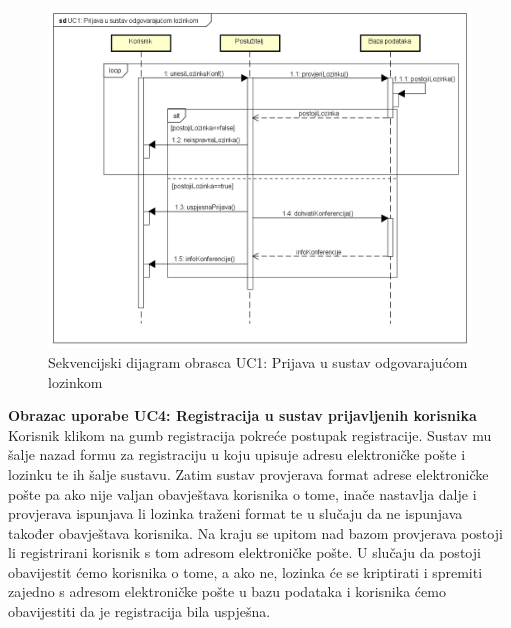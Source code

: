 				\begin{figure}[H]
					\includegraphics[width=\textwidth]{slike/uc1Sekvencijski.PNG} %
					\caption{Sekvencijski dijagram obrasca UC1: Prijava u sustav odgovarajućom lozinkom}
					\label{fig:uc1-sekvencijski} %
				\end{figure}
				\eject
					\textbf{Obrazac uporabe UC4: Registracija u sustav prijavljenih korisnika}\\
				Korisnik klikom na gumb registracija pokreće postupak registracije. Sustav mu šalje nazad formu za registraciju u koju upisuje adresu elektroničke pošte i lozinku te ih šalje sustavu. Zatim sustav provjerava format adrese elektroničke pošte pa ako nije valjan obavještava korisnika o tome, inače nastavlja dalje i provjerava ispunjava li lozinka traženi format te u slučaju da ne ispunjava također obavještava korisnika. Na kraju se upitom nad bazom provjerava postoji li registrirani korisnik s tom adresom elektroničke pošte. U slučaju da postoji obavijestit ćemo korisnika o tome, a ako ne, lozinka će se kriptirati i spremiti zajedno s adresom elektroničke pošte u bazu podataka i korisnika ćemo obavijestiti da je registracija bila uspješna.

